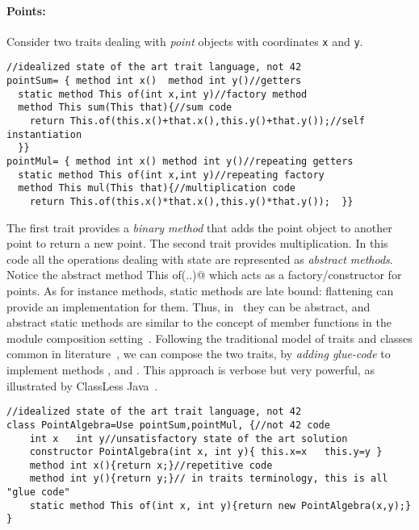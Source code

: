 \paragraph{Points:} Consider two 
traits dealing with \emph{point} objects with coordinates \lstinline{x} and
\lstinline{y}.
\begin{lstlisting}
//idealized state of the art trait language, not 42
pointSum= { method int x()  method int y()//getters
  static method This of(int x,int y)//factory method
  method This sum(This that){//sum code
    return This.of(this.x()+that.x(),this.y()+that.y());//self instantiation
  }}
pointMul= { method int x() method int y()//repeating getters
  static method This of(int x,int y)//repeating factory
  method This mul(This that){//multiplication code
    return This.of(this.x()*that.x(),this.y()*that.y());  }}
\end{lstlisting}
The first trait provides a \emph{binary method} that 
adds the point object to another point to return a new point. 
The second trait provides multiplication. In this code all the operations dealing with state are represented as \emph{abstract methods}.
Notice the abstract \Q@static method This of(..)@ which acts as a factory/constructor
for points. 
As for instance methods, static methods are late bound:  flattening can provide an implementation for them.
Thus, in \name\ they can be abstract, and abstract static methods are similar to the concept of member functions in the module composition setting~\cite{ancona_zucca_2002}.
Following the traditional model of traits and classes common in literature~\cite{ducasse2006traits},
we can compose the two traits, by \emph{adding glue-code}
to implement methods \Q@x@, \Q@y@ and \Q@of@.
This approach is verbose but very
powerful, as illustrated by ClassLess Java~\cite{wang2016classless}.
\begin{lstlisting}
//idealized state of the art trait language, not 42
class PointAlgebra=Use pointSum,pointMul, {//not 42 code
    int x   int y//unsatisfactory state of the art solution
    constructor PointAlgebra(int x, int y){ this.x=x   this.y=y }
    method int x(){return x;}//repetitive code
    method int y(){return y;}// in traits terminology, this is all "glue code"
    static method This of(int x, int y){return new PointAlgebra(x,y);}  }
\end{lstlisting}




